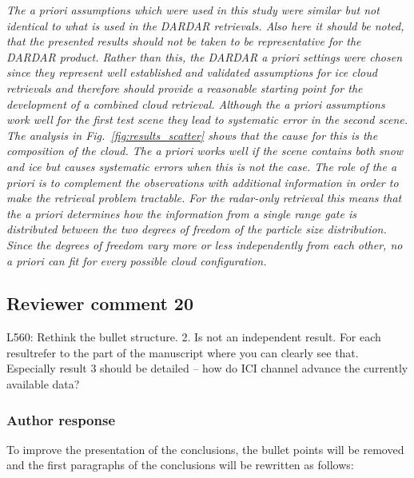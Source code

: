 \documentclass[11pt]{scrartcl}
\begin{document}
\textit{
  The a priori assumptions which were used in this study were similar but not
  identical to what is used in the DARDAR retrievals. Also here it should be
  noted, that the presented results should not be taken to be representative for
  the DARDAR product. Rather than this, the DARDAR a priori settings were chosen
  since they represent well established and validated assumptions for ice cloud
  retrievals and therefore should provide a reasonable starting point for the
  development of a combined cloud retrieval. Although the a priori assumptions
  work well for the first test scene they lead to systematic error in the second
  scene. The analysis in Fig.~\ref{fig:results_scatter} shows that the cause for
  this is the composition of the cloud. The a priori works well if the scene
  contains both snow and ice but causes systematic errors when this is not the
  case. The role of the a priori is to complement the observations with additional
  information in order to make the retrieval problem tractable. For the radar-only
  retrieval this means that the a priori determines how the information from a
  single range gate is distributed between the two degrees of freedom of the
  particle size distribution. Since the degrees of freedom vary more or less
  independently from each other, no a priori can fit for every possible cloud
  configuration.
}

\subsection*{Reviewer comment 20}
L560:  Rethink the bullet structure.  2.  Is not an independent result.  For each resultrefer to the part of the manuscript where you can clearly see that.  Especially result 3 should be detailed – how do ICI channel advance the currently available data?

\subsubsection*{Author response}

To improve the presentation of the conclusions, the bullet points will be removed
and the first paragraphs of the conclusions will be rewritten as follows:
\end{document}
